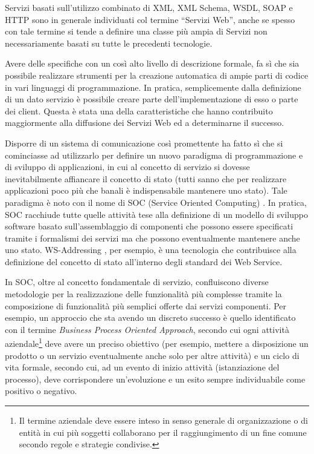 Servizi basati sull'utilizzo combinato di XML, XML Schema, WSDL, SOAP e HTTP
sono in generale individuati col termine ``Servizi Web'', anche se spesso con
tale termine si tende a definire una classe più ampia di Servizi non necessariamente basati su tutte le
precedenti tecnologie.

Avere delle specifiche con un così alto livello di descrizione formale, fa sì
che sia possibile realizzare strumenti per la creazione
automatica di ampie parti di codice in vari linguaggi di programmazione. In
pratica, semplicemente dalla definizione di un dato servizio è possibile creare
parte dell'implementazione di esso o parte dei client. Questa è stata una della
caratteristiche che hanno contribuito maggiormente alla diffusione dei Servizi
Web ed a determinarne il successo.

Disporre di un sistema di comunicazione così promettente ha fatto sì che si
cominciasse ad utilizzarlo per definire un nuovo paradigma di programmazione 
e di sviluppo di applicazioni, in cui al concetto di servizio si dovesse
inevitabilmente affiancare il concetto di stato (tutti sanno che per
realizzare applicazioni poco più che banali è indispensabile mantenere uno
stato). Tale paradigma è noto con il nome di SOC (Service Oriented Computing)
\cite{SOC1} \cite{WEBSERVICES}. In pratica, SOC racchiude tutte quelle attività
tese alla definizione di un modello di sviluppo software basato sull'assemblaggio di componenti che possono essere
specificati tramite i formalismi dei servizi ma che possono eventualmente
mantenere anche uno stato. WS-Addressing \cite{WS-Addressing}, per esempio, è
una tecnologia che contribuisce alla definizione del concetto di stato all'interno degli standard
dei Web Service.

In SOC, oltre al concetto fondamentale di servizio, confluiscono diverse
metodologie per la realizzazione delle funzionalità più complesse tramite la
composizione di funzionalità più semplici offerte dai servizi componenti. Per
esempio, un approccio che sta avendo un discreto successo è quello identificato
con il termine \emph{Business Process Oriented Approach}, secondo cui ogni
attività aziendale\footnote{Il termine aziendale deve essere inteso in senso
generale di organizzazione o di entità in cui più soggetti collaborano per il
raggiungimento di un fine comune secondo regole e strategie condivise.} deve
avere un preciso obiettivo (per esempio, mettere a disposizione un prodotto o un
servizio eventualmente anche solo per altre attività) e un ciclo di vita formale,
secondo cui, ad un evento di inizio attività (istanziazione del processo), deve
corrispondere un'evoluzione e un esito sempre individuabile come positivo o
negativo.


